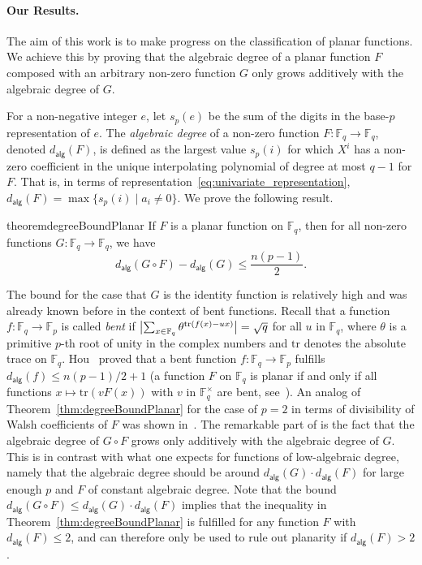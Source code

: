 \documentclass[12pt]{article}
\newcommand{\F}{\mathbb{F}}
\newcommand{\tr}{\mathrm{tr}}
\newcommand{\wt}{s_p}
\newcommand{\adeg}[1]{d_{\mathsf{alg}}(#1)}
\begin{document}
\paragraph{Our Results.}
The aim of this work is to make progress on the classification of planar functions. We achieve this by proving that the algebraic degree of a planar function $F$ composed with an arbitrary non-zero function $G$ only grows additively with the algebraic degree of $G$.

For a non-negative integer $e$, let $\wt(e)$ be the sum of the digits in the base-$p$ representation of $e$. The \emph{algebraic degree} of a non-zero function $F \colon \F_{q} \rightarrow \F_{q}$, denoted $\adeg{F}$, is defined as the largest value $s_p(i)$ for which $X^i$ has a non-zero coefficient in the unique interpolating polynomial of degree at most $q-1$ for $F$. That is, in terms of representation~\eqref{eq:univariate_representation}, $\adeg{F} = \max\{\wt(i) \mid a_i \neq 0\}$. 
We prove the following result.
\begin{restatable}{theorem}{degreeBoundPlanar} \label{thm:degreeBoundPlanar}
If $F$ is a planar function on $\F_q$, then for all non-zero functions $G : \F_q \to \F_q$, we have
\begin{equation*}
\adeg{G \circ F} - \adeg{G} \le \frac{n(p - 1)}{2}.
\end{equation*}
\end{restatable}

The bound for the case that $G$ is the identity function is relatively high and was already known before in the context of bent functions. Recall that a function $f \colon \F_q \rightarrow \F_p$ is called \emph{bent} if
$\smash{\bigl\lvert \sum_{x \in \F_q} \theta^{\tr(f(x)-ux)} \bigr\rvert} = \sqrt{q}$ for all $u$ in $\F_q$, where $\theta$ is a primitive $p$-th root of unity in the complex numbers and $\tr$ denotes the absolute trace on $\F_{q}$.
Hou~\cite{DBLP:journals/ffa/Hou04} proved that a bent function $f \colon \F_{q} \rightarrow \F_p$ fulfills $\adeg{f} \leq n(p-1)/2+1$ (a function $F$ on $\F_{q}$ is planar if and only if all functions $x \mapsto \tr(v F(x))$ with $v$ in $\F_q^\times$ are bent, see~\cite{carlet2001generalized,DBLP:journals/dcc/Pott16}).  An analog of Theorem~\ref{thm:degreeBoundPlanar} for the case of $p=2$ in terms of divisibility of Walsh coefficients of $F$ was shown in~\cite{DBLP:conf/eurocrypt/CanteautV02}. The remarkable part of  is the fact that the algebraic degree of $G \circ F$ grows only additively with the algebraic degree of $G$. This is in contrast with what one expects for functions of low-algebraic degree, namely that the
algebraic degree should be around $\adeg{G} \cdot \adeg{F}$ for large enough $p$ and $F$ of constant algebraic degree. Note that the bound $\adeg{G \circ F} \leq \adeg{G} \cdot \adeg{F}$ implies that the inequality in Theorem~\ref{thm:degreeBoundPlanar} is  fulfilled for any function $F$ with $\adeg{F} \leq 2$, and can therefore only be used to rule out planarity if $\adeg{F} >2$. 
\end{document}
